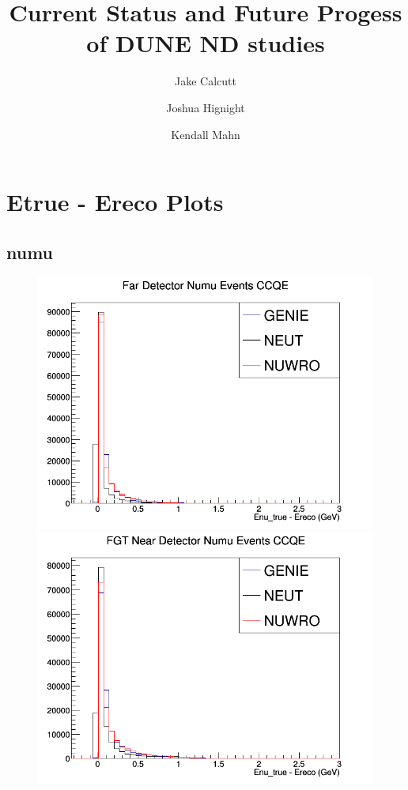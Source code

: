 \documentclass[12pt]{article}
\title{Current Status and Future Progess of DUNE ND studies}
\date{}
\begin{document}
\author[1]{Jake Calcutt}
\author[1]{Joshua Hignight}
\author[1]{Kendall Mahn}


\maketitle
\thispagestyle{fancy}

\section{Etrue - Ereco Plots}
\subsection{numu}
\begin{figure}[h]
\includegraphics[width=\linewidth]{Ereco_Etrue/numu_FD_CCQE.png}
\endminipage
{}
\includegraphics[width=\linewidth]{Ereco_Etrue/numu_FGT_CCQE.png}

\end{figure}
\end{document}
